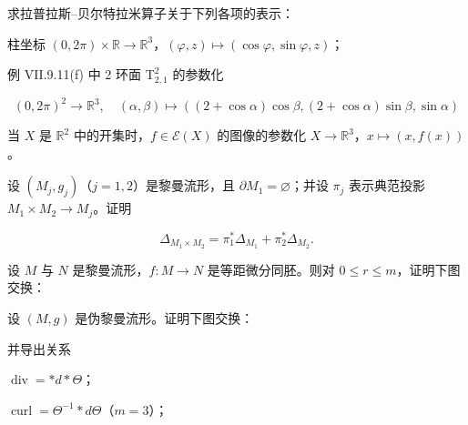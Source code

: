\begin{exercises}
\item

求拉普拉斯–贝尔特拉米算子关于下列各项的表示：

\begin{subitems}
\item

柱坐标 $ (0, 2\pi) \times \mathbb{R} \to \mathbb{R}^{3} $，$ (\varphi, z) \mapsto (\cos\varphi, \sin\varphi, z) $；

\item

例 VII.9.11(f) 中 2 环面 $ \mathrm{T}_{2,1}^{2} $ 的参数化

\[
(0, 2\pi)^{2} \to \mathbb{R}^{3}, \quad (\alpha, \beta) \mapsto ((2 + \cos\alpha)\cos\beta, (2 + \cos\alpha)\sin\beta, \sin\alpha)
\]
\item

当 $ X $ 是 $ \mathbb{R}^{2} $ 中的开集时，$ f \in \mathcal{E}(X) $ 的图像的参数化 $ X \to \mathbb{R}^{3} $，$ x \mapsto (x, f(x)) $。

\end{subitems}

\item

设 $ (M_{j}, g_{j}) $（$ j = 1, 2 $）是黎曼流形，且 $ \partial M_{1} = \varnothing $；并设 $ \pi_{j} $ 表示典范投影 $ M_{1} \times M_{2} \to M_{j} $。证明

\[
\Delta_{M_{1} \times M_{2}} = \pi_{1}^{*}\Delta_{M_{1}} + \pi_{2}^{*}\Delta_{M_{2}} .
\]
\item

设 $ M $ 与 $ N $ 是黎曼流形，$ f: M \to N $ 是等距微分同胚。则对 $ 0 \le r \le m $，证明下图交换：


\item

设 $ (M, g) $ 是伪黎曼流形。证明下图交换：


并导出关系

\begin{subitems}
\item

$ \operatorname{div} = \ast d\ast\Theta $；

\item

$ \operatorname{curl} = \Theta^{-1}\ast d\Theta $（$ m = 3 $）；


\end{subitems}
\end{exercises}

